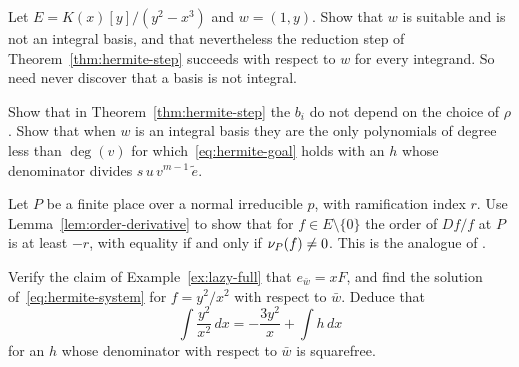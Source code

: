 \begin{exercise}
Let $E = K(x)[y]/(y^2 - x^3)$ and $w = (1, y)$. Show that $w$ is suitable and
is not an integral basis, and that nevertheless the reduction step of
Theorem~\ref{thm:hermite-step} succeeds with respect to $w$ for every
integrand. So  need never discover that a basis is
not integral.
\end{exercise}

\begin{exercise}
Show that in Theorem~\ref{thm:hermite-step} the $b_i$ do not depend on the
choice of $\rho$. Show that when $w$ is an integral basis they are the only
polynomials of degree less than $\deg(v)$ for which~\eqref{eq:hermite-goal}
holds with an $h$ whose denominator divides $s\,u\,v^{m-1}\,\tilde e$.
\end{exercise}

\begin{exercise}
Let $P$ be a finite place over a normal irreducible $p$, with ramification
index $r$. Use Lemma~\ref{lem:order-derivative} to show that for $f \in E
\setminus \{0\}$ the order of $Df/f$ at $P$ is at least $-r$, with equality if
and only if $\nu_{P}(f) \ne 0$. This is the analogue of
.
\end{exercise}

\begin{exercise}
Verify the claim of Example~\ref{ex:lazy-full} that $e_{\bar w} = x F$, and
find the solution of~\eqref{eq:hermite-system} for $f = y^2/x^2$ with respect
to $\bar w$. Deduce that
\[
  \int \frac{y^2}{x^2}\, dx = -\frac{3 y^2}{x} + \int h\, dx
\]
for an $h$ whose denominator with respect to $\bar w$ is squarefree.
\end{exercise}

